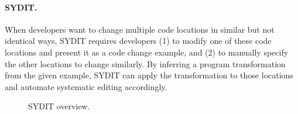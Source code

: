 \paragraph{SYDIT.} When developers want to change multiple code locations in similar but not identical ways, SYDIT requires developers (1) to modify one of these code locations and present it as a code change example, and (2) to manually specify the other locations to change similarly. By inferring a program transformation from the given example, SYDIT can apply the transformation to those locations and automate systematic editing accordingly.

\begin{figure}
\centering
{}
\caption{SYDIT overview.}
\label{fig:syditoverview}
\end{figure}

